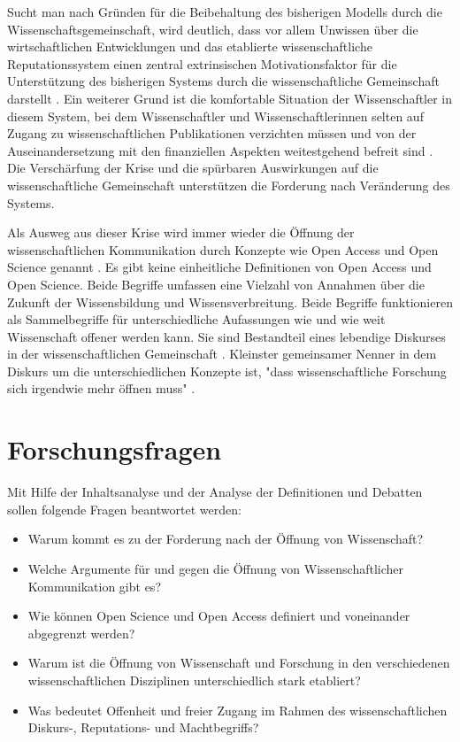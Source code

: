 Sucht man nach Gründen für die Beibehaltung des bisherigen Modells durch die Wissenschaftsgemeinschaft, wird deutlich, dass vor allem Unwissen über die wirtschaftlichen Entwicklungen und das etablierte wissenschaftliche Reputationssystem einen zentral extrinsischen Motivationsfaktor für die Unterstützung des bisherigen Systems durch die wissenschaftliche Gemeinschaft darstellt \cite{minssen_2012_arbeit}. Ein weiterer Grund ist die komfortable Situation der Wissenschaftler in diesem System, bei dem Wissenschaftler und Wissenschaftlerinnen selten auf Zugang zu wissenschaftlichen Publikationen verzichten müssen und von der Auseinandersetzung mit den finanziellen Aspekten weitestgehend befreit sind \cite{herb_2010}. Die Verschärfung der Krise und die spürbaren Auswirkungen auf die wissenschaftliche Gemeinschaft unterstützen die Forderung nach Veränderung des Systems.

Als Ausweg aus dieser Krise wird immer wieder die Öffnung der wissenschaftlichen Kommunikation durch Konzepte wie Open Access und Open Science genannt \cite{suchen}. Es gibt keine einheitliche Definitionen von Open Access und Open Science. Beide Begriffe umfassen eine Vielzahl von Annahmen über die Zukunft der Wissensbildung und Wissensverbreitung. Beide Begriffe funktionieren als Sammelbegriffe für unterschiedliche Aufassungen wie und wie weit Wissenschaft offener werden kann. Sie sind Bestandteil eines lebendige Diskurses in der wissenschaftlichen Gemeinschaft \cite{schulze_2013_open}. Kleinster gemeinsamer Nenner in dem Diskurs um die unterschiedlichen Konzepte ist, "dass wissenschaftliche Forschung sich irgendwie mehr öffnen muss" \cite{cite:9}.

\section{Forschungsfragen}

Mit Hilfe der Inhaltsanalyse und der Analyse der Definitionen und Debatten sollen folgende Fragen beantwortet werden:
\begin{itemize}
\item Warum kommt es zu der Forderung nach der Öffnung von Wissenschaft?
\item Welche Argumente für und gegen die Öffnung von Wissenschaftlicher Kommunikation gibt es?
\item Wie können Open Science und Open Access definiert und voneinander abgegrenzt werden?
\item Warum ist die Öffnung von Wissenschaft und Forschung in den verschiedenen wissenschaftlichen Disziplinen unterschiedlich stark etabliert?
\item Was bedeutet Offenheit und freier Zugang im Rahmen des wissenschaftlichen Diskurs-, Reputations- und Machtbegriffs?
\end{itemize}

